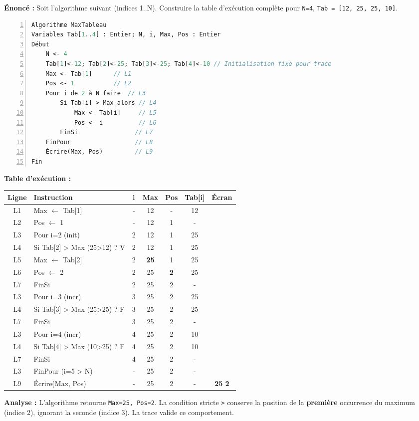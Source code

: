 \documentclass[11pt]{article}
\begin{document}
\begin{exoresolu}
\textbf{Énoncé :} Soit l'algorithme suivant (indices 1..N). Construire la table d'exécution complète pour \texttt{N=4}, \texttt{Tab = [12, 25, 25, 10]}.
\begin{lstlisting}[language=Pascal, numbers=left]
Algorithme MaxTableau
Variables Tab[1..4] : Entier; N, i, Max, Pos : Entier
Début
    N <- 4
    Tab[1]<-12; Tab[2]<-25; Tab[3]<-25; Tab[4]<-10 // Initialisation fixe pour trace
    Max <- Tab[1]      // L1
    Pos <- 1           // L2
    Pour i de 2 à N faire  // L3
        Si Tab[i] > Max alors // L4
            Max <- Tab[i]     // L5
            Pos <- i          // L6
        FinSi                // L7
    FinPour                  // L8
    Écrire(Max, Pos)         // L9
Fin
\end{lstlisting}
\tcblower
\textbf{Table d'exécution :}
\begin{center}
\begin{tabular}{|c|l|c|c|c|c|c|}
\hline
\textbf{Ligne} & \textbf{Instruction} & \textbf{i} & \textbf{Max} & \textbf{Pos} & \textbf{Tab[i]} & \textbf{Écran} \\
\hline
L1 & Max $\leftarrow$ Tab[1] & - & 12 & - & 12 & \\
L2 & Pos $\leftarrow$ 1 & - & 12 & 1 & - & \\
L3 & Pour i=2 (init) & 2 & 12 & 1 & 25 & \\
L4 & Si Tab[2] > Max (25>12) ? V & 2 & 12 & 1 & 25 & \\
L5 & Max $\leftarrow$ Tab[2] & 2 & \textbf{25} & 1 & 25 & \\
L6 & Pos $\leftarrow$ 2 & 2 & 25 & \textbf{2} & 25 & \\
L7 & FinSi & 2 & 25 & 2 & - & \\
L3 & Pour i=3 (incr) & 3 & 25 & 2 & 25 & \\
L4 & Si Tab[3] > Max (25>25) ? F & 3 & 25 & 2 & 25 & \\
L7 & FinSi & 3 & 25 & 2 & - & \\
L3 & Pour i=4 (incr) & 4 & 25 & 2 & 10 & \\
L4 & Si Tab[4] > Max (10>25) ? F & 4 & 25 & 2 & 10 & \\
L7 & FinSi & 4 & 25 & 2 & - & \\
L3 & FinPour (i=5 > N) & - & 25 & 2 & - & \\
L9 & Écrire(Max, Pos) & - & 25 & 2 & - & \textbf{25 2} \\
\hline
\end{tabular}
\end{center}
\textbf{Analyse :} L'algorithme retourne \texttt{Max=25, Pos=2}. La condition stricte \texttt{>} conserve la position de la \textbf{première} occurrence du maximum (indice 2), ignorant la seconde (indice 3). La trace valide ce comportement.
\end{exoresolu}
\end{document}
